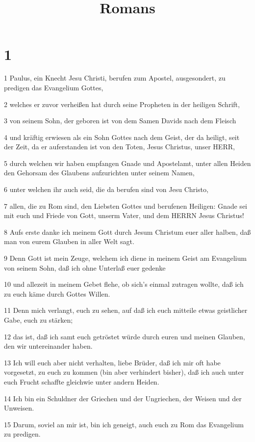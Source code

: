 

\title{Romans}


\chapter{1}

\par 1 Paulus, ein Knecht Jesu Christi, berufen zum Apostel, ausgesondert, zu predigen das Evangelium Gottes,
\par 2 welches er zuvor verheißen hat durch seine Propheten in der heiligen Schrift,
\par 3 von seinem Sohn, der geboren ist von dem Samen Davids nach dem Fleisch
\par 4 und kräftig erwiesen als ein Sohn Gottes nach dem Geist, der da heiligt, seit der Zeit, da er auferstanden ist von den Toten, Jesus Christus, unser HERR,
\par 5 durch welchen wir haben empfangen Gnade und Apostelamt, unter allen Heiden den Gehorsam des Glaubens aufzurichten unter seinem Namen,
\par 6 unter welchen ihr auch seid, die da berufen sind von Jesu Christo,
\par 7 allen, die zu Rom sind, den Liebsten Gottes und berufenen Heiligen: Gnade sei mit euch und Friede von Gott, unserm Vater, und dem HERRN Jesus Christus!
\par 8 Aufs erste danke ich meinem Gott durch Jesum Christum euer aller halben, daß man von eurem Glauben in aller Welt sagt.
\par 9 Denn Gott ist mein Zeuge, welchem ich diene in meinem Geist am Evangelium von seinem Sohn, daß ich ohne Unterlaß euer gedenke
\par 10 und allezeit in meinem Gebet flehe, ob sich's einmal zutragen wollte, daß ich zu euch käme durch Gottes Willen.
\par 11 Denn mich verlangt, euch zu sehen, auf daß ich euch mitteile etwas geistlicher Gabe, euch zu stärken;
\par 12 das ist, daß ich samt euch getröstet würde durch euren und meinen Glauben, den wir untereinander haben.
\par 13 Ich will euch aber nicht verhalten, liebe Brüder, daß ich mir oft habe vorgesetzt, zu euch zu kommen (bin aber verhindert bisher), daß ich auch unter euch Frucht schaffte gleichwie unter andern Heiden.
\par 14 Ich bin ein Schuldner der Griechen und der Ungriechen, der Weisen und der Unweisen.
\par 15 Darum, soviel an mir ist, bin ich geneigt, auch euch zu Rom das Evangelium zu predigen.
